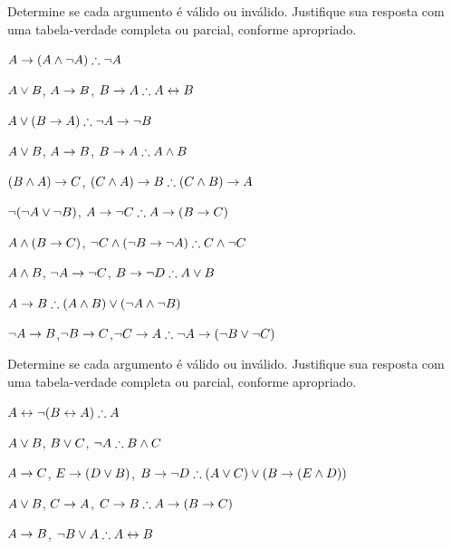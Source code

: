 \noindent\problempart Determine se cada argumento é válido ou inválido. Justifique sua resposta com uma tabela-verdade completa ou parcial, conforme apropriado.
\label{pr.TT.valid5} 
\begin{compactlist}
\item $A\eif(A\eand\enot A)\therefore \enot A$ \hfill {}
\item $A \vee B$, $A \rightarrow B$, $B \eif A \therefore  A \eiff B$  \hfill {}
\item $A\eor(B\eif A)\therefore \enot A \eif \enot B$ \hfill {}
\item $A \vee B$, $A \rightarrow B$, $ B \eif A \therefore  A \eand B$ \hfill {}
\item $(B\wedge A)\rightarrow C$, $(C\eand A)\eif B\therefore (C\eand B)\eif A$ \hfill {}
\item $\neg (\neg A \vee \neg B)$, $A \eif \enot C \therefore  A \eif (B \eif C)$ \hfill {}
\item $A \wedge (B \rightarrow C)$, $\enot C \eand (\enot B \eif \enot A)\therefore C \eand \enot C$ \hfill {}
\item $A \wedge B$, $\neg A \rightarrow \neg C$, $B \eif \enot D \therefore  A \eor B$ \hfill {}
\item $A \eif B\therefore (A \eand B) \eor (\enot A \eand \enot B)$ \hfill {}
\item $\neg A \rightarrow B$,$ \neg B \rightarrow C $,$ \enot C \eif A \therefore  \enot A \eif (\enot B \eor \enot C)$ \hfill {}

\end{compactlist}

\noindent\problempart Determine se cada argumento é válido ou inválido. Justifique sua resposta com uma tabela-verdade completa ou parcial, conforme apropriado.
\label{pr.TT.valid6} 
\begin{compactlist}
\item $A\eiff\enot(B\eiff A)\therefore A$ \hfill {}
\item $A\vee B$, $B\vee C$, $\enot A\therefore B \eand C$ \hfill {}
\item $A \rightarrow C$, $E \rightarrow (D \vee B)$, $B \eif \enot D\therefore (A \eor C) \eor (B \eif (E \eand D))$ \hfill {}
\item $A \vee B$, $C \rightarrow A$, $C \eif B\therefore A \eif (B \eif C)$ \hfill {}
\item $A \rightarrow B$, $\enot B \eor A\therefore A \eiff B$ \hfill {}
\end{compactlist}
